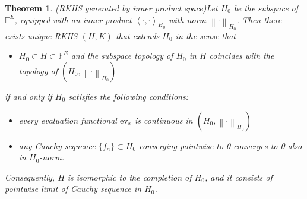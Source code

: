 \documentclass[a4paper,12pt]{article}
\newtheorem{thm}{Theorem}[section]
\theoremstyle{remark}
\theoremstyle{definition}
\theoremstyle{definition}
\theoremstyle{definition}
\newcommand{\ip}[2]{\left<#1, #2 \right>}
\newcommand{\norm}[1]{\left\| #1 \right\|}
\newcommand{\ev}[1]{\mathrm{ev}_{#1}}
\begin{document}
\begin{thm} (RKHS generated by inner product space)\label{RKHS generated by ip sp}
	Let \( H_0 \) be the subspace of \( \mathbb{F}^E \), equipped with an inner product \( \ip{\cdot }{\cdot }_{H_0} \) with norm \( \norm{\cdot }_{H_0} \).
	Then there exists unique RKHS \( (H,K) \) that extends \( H_0 \) in the sense that
	\begin{itemize}
		\item[(a)] \( H_0 \subset H \subset \mathbb{F}^E\) and the subspace topology of \( H_0 \) in \( H \) coincides with the topology of \( (H_0, \norm{\cdot }_{H_0}) \)
	\end{itemize}
	if and only if \( H_0 \) satisfies the following conditions:
	\begin{itemize}
		\item[(b)] every evaluation functional \( \ev{x} \) is continuous in \( (H_0, \norm{\cdot }_{H_0})\)
		\item[(c)] any Cauchy sequence \( \{f_n\} \subset H_0 \) converging pointwise to 0 converges to 0 also in \( H_0 \)-norm.
	\end{itemize}
	Consequently, \( H \) is isomorphic to the completion of \( H_0 \), and it consists of pointwise limit of Cauchy sequence in \( H_0 \).
\end{thm}
\end{document}
